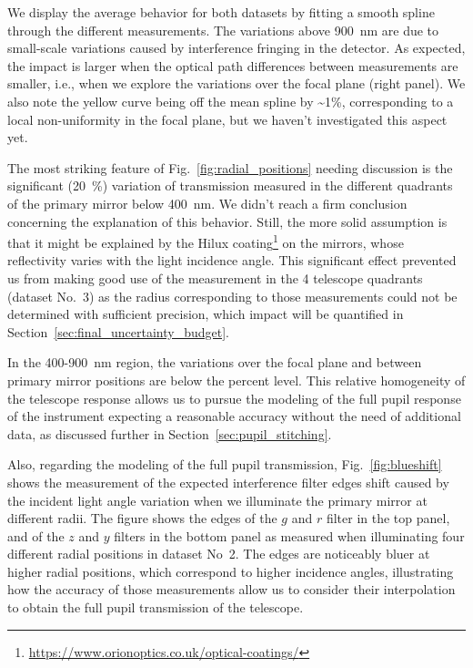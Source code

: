 We display the average behavior for both datasets by fitting a smooth spline through the different measurements. The variations above \SI{900}{\nano\meter} are due to small-scale variations caused by interference fringing in the detector. As expected, the impact is larger when the optical path differences between measurements are smaller, i.e., when we explore the variations over the focal plane (right panel). We also note the yellow curve being off the mean spline by \textasciitilde 1\%, corresponding to a local non-uniformity in the focal plane, but we haven't investigated this aspect yet. 

The most striking feature of Fig.~\ref{fig:radial_positions} needing discussion is the significant (\SI{20}{\%}) variation of transmission measured in the different quadrants of the primary mirror below \SI{400}{\nano\meter}. We didn't reach a firm conclusion concerning the explanation of this behavior. Still, the more solid assumption is that it might be explained by the Hilux coating\footnote{\url{https://www.orionoptics.co.uk/optical-coatings/}} on the \SD mirrors, whose reflectivity varies with the light incidence angle. This significant effect prevented us from making good use of the measurement in the 4 telescope quadrants (dataset No.~3) as the radius corresponding to those measurements could not be determined with sufficient precision, which impact will be quantified in Section~\ref{sec:final_uncertainty_budget}.

In the 400-\SI{900}{\nano\meter} region, the variations over the focal plane and
between primary mirror positions are below the percent level. This relative
homogeneity of the telescope response allows us to pursue the modeling of the full
pupil response of the instrument expecting a reasonable accuracy without the
need of additional data, as discussed further in Section~\ref{sec:pupil_stitching}.

Also, regarding the modeling of the full pupil transmission,
Fig.~\ref{fig:blueshift} shows the measurement of the expected interference
filter edges shift caused by the incident light angle variation when we
illuminate the primary mirror at different radii. The figure shows the edges of
the $g$ and $r$ filter in the top panel, and of the $z$ and $y$ filters in the
bottom panel as measured when illuminating four different radial positions in
dataset No~2. The edges are noticeably bluer at higher radial positions, which
correspond to higher incidence angles, illustrating how the accuracy of those
measurements allow us to consider their interpolation to obtain the full
pupil transmission of the telescope.


